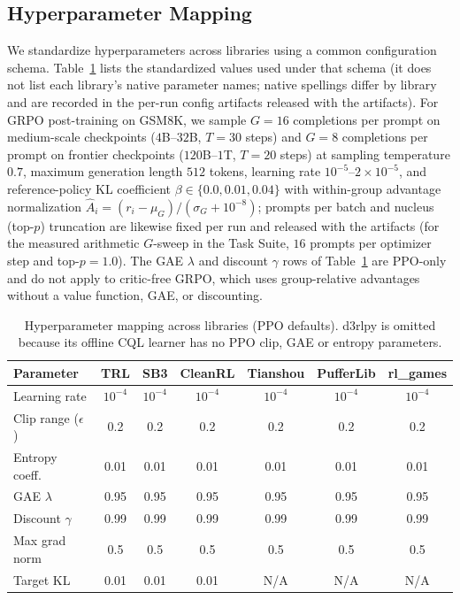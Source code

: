 \subsection{Hyperparameter Mapping}

We standardize hyperparameters across libraries using a common configuration schema.
Table~\ref{tab:hyperparams} lists the standardized values used under that schema (it does not list each library's native parameter names; native spellings differ by library and are recorded in the per-run config artifacts released with the artifacts). For GRPO post-training on GSM8K, we sample $G = 16$ completions per prompt on medium-scale checkpoints ($4$B--$32$B, $T = 30$ steps) and $G = 8$ completions per prompt on frontier checkpoints ($120$B--$1$T, $T = 20$ steps) at sampling temperature $0.7$, maximum generation length $512$ tokens, learning rate $10^{-5}$--$2 \times 10^{-5}$, and reference-policy KL coefficient $\beta \in \{0.0, 0.01, 0.04\}$ with within-group advantage normalization $\hat{A}_i = (r_i - \mu_G)/(\sigma_G + 10^{-8})$; prompts per batch and nucleus (top-$p$) truncation are likewise fixed per run and released with the artifacts (for the measured arithmetic $G$-sweep in the Task Suite, $16$ prompts per optimizer step and top-$p = 1.0$).
The GAE $\lambda$ and discount $\gamma$ rows of Table~\ref{tab:hyperparams} are PPO-only and do not apply to critic-free GRPO, which uses group-relative advantages without a value function, GAE, or discounting.

\begin{table}[htbp]
\centering
\caption{Hyperparameter mapping across libraries (PPO defaults). d3rlpy is omitted because its offline CQL learner has no PPO clip, GAE or entropy parameters.}
\label{tab:hyperparams}
\begin{tabular}{lcccccc}
\toprule
\textbf{Parameter} & \textbf{TRL} & \textbf{SB3} & \textbf{CleanRL} & \textbf{Tianshou} & \textbf{PufferLib} & \textbf{rl\_games} \\
\midrule
Learning rate & $10^{-4}$ & $10^{-4}$ & $10^{-4}$ & $10^{-4}$ & $10^{-4}$ & $10^{-4}$ \\
Clip range ($\epsilon$) & 0.2 & 0.2 & 0.2 & 0.2 & 0.2 & 0.2 \\
Entropy coeff. & 0.01 & 0.01 & 0.01 & 0.01 & 0.01 & 0.01 \\
GAE $\lambda$ & 0.95 & 0.95 & 0.95 & 0.95 & 0.95 & 0.95 \\
Discount $\gamma$ & 0.99 & 0.99 & 0.99 & 0.99 & 0.99 & 0.99 \\
Max grad norm & 0.5 & 0.5 & 0.5 & 0.5 & 0.5 & 0.5 \\
Target KL & 0.01 & 0.01 & 0.01 & N/A & N/A & N/A \\
\bottomrule
\end{tabular}
\end{table}

